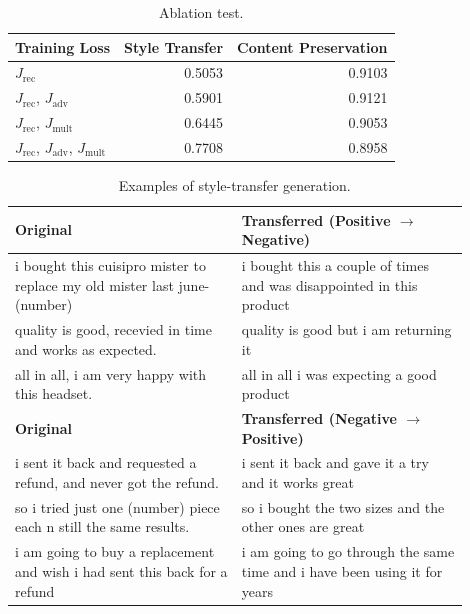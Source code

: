 \begin{table}[!t]
	\centering
	\begin{tabular}{| l | r | r |}
		\hline
		\textbf{Training Loss}                          & \textbf{Style Transfer} & \textbf{Content Preservation} \\
		\hline
		\hline
		$J_\text{rec}$                                  & 0.5053                  & 0.9103                        \\
		\hline
		$J_\text{rec}$, $J_\text{adv}$                  & 0.5901                  & 0.9121                        \\
		\hline
		$J_\text{rec}$, $J_\text{mult}$                 & 0.6445                  & 0.9053                        \\
		\hline
		$J_\text{rec}$, $J_\text{adv}$, $J_\text{mult}$ & 0.7708                  & 0.8958                        \\
		\hline
	\end{tabular}
	\caption{Ablation test.}
	\label{tab:ablation-results}
\end{table}

\begin{table}[!t]
	\centering
	\begin{tabular}{| p{0.45\linewidth} | p{0.45\linewidth} |}
		\hline
		\textbf{{Original}}                                                        & \textbf{Transferred (Positive $\rightarrow$ Negative)}                    \\
		\hline
		\hline
		i bought this cuisipro mister to replace my old mister last june-(number)  & i bought this a couple of times and was disappointed in this product      \\
		\hline
		quality is good, recevied in time and works as expected.                   & quality is good but i am returning it                                     \\
		\hline
		all in all, i am very happy with this headset.                             & all in all i was expecting a good product                                 \\
		\hline
		\hline
		\textbf{{Original}}                                                        & \textbf{Transferred (Negative $\rightarrow$ Positive)}                    \\
		\hline
		\hline
		i sent it back and requested a refund, and never got the refund.           & i sent it back and gave it a try and it works great                       \\
		\hline
		so i tried just one (number) piece each n still the same results.          & so i bought the two sizes and the other ones are great                    \\
		\hline
		i am going to buy a replacement and wish i had sent this back for a refund & i am going to go through the same time and i have been using it for years \\
		\hline
	\end{tabular}
	\caption{Examples of style-transfer generation.}
	\label{tab:transfer-samples}
\end{table}
